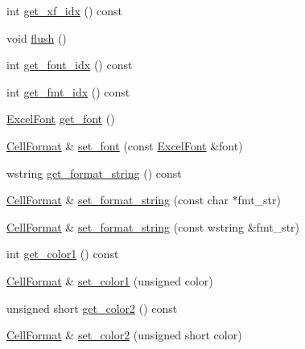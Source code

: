 \begin{DoxyCompactItemize}
\item 
int \hyperlink{struct_excel_format_1_1_cell_format_af678b79b8c8dbbb6a521c01cadd4ae5d}{get\+\_\+xf\+\_\+idx} () const 
\item 
void \hyperlink{struct_excel_format_1_1_cell_format_aeb3ceb42c80ec9f02a329f9bfa3aafdf}{flush} ()
\item 
int \hyperlink{struct_excel_format_1_1_cell_format_a5a50b4ec7c14f7144ff099a9b52301c9}{get\+\_\+font\+\_\+idx} () const 
\item 
int \hyperlink{struct_excel_format_1_1_cell_format_a1b557944889ef7cd493e6f6fee96a0b8}{get\+\_\+fmt\+\_\+idx} () const 
\item 
\hyperlink{struct_excel_format_1_1_excel_font}{Excel\+Font} \hyperlink{struct_excel_format_1_1_cell_format_a67fe7e97df32e192ab8e32a517f880a0}{get\+\_\+font} ()
\item 
\hyperlink{struct_excel_format_1_1_cell_format}{Cell\+Format} \& \hyperlink{struct_excel_format_1_1_cell_format_a584bde53b0699e233b3ca4e742a1fb5f}{set\+\_\+font} (const \hyperlink{struct_excel_format_1_1_excel_font}{Excel\+Font} \&font)
\item 
wstring \hyperlink{struct_excel_format_1_1_cell_format_a44e908835e6aae1c5bfda4e3adffecc7}{get\+\_\+format\+\_\+string} () const 
\item 
\hyperlink{struct_excel_format_1_1_cell_format}{Cell\+Format} \& \hyperlink{struct_excel_format_1_1_cell_format_aa4982e072d7292699e8302be63b966ba}{set\+\_\+format\+\_\+string} (const char $\ast$fmt\+\_\+str)
\item 
\hyperlink{struct_excel_format_1_1_cell_format}{Cell\+Format} \& \hyperlink{struct_excel_format_1_1_cell_format_afa1e52f7215fda94ecbf92029401fef3}{set\+\_\+format\+\_\+string} (const wstring \&fmt\+\_\+str)
\item 
int \hyperlink{struct_excel_format_1_1_cell_format_aef38f45721098661616821b754098e3b}{get\+\_\+color1} () const 
\item 
\hyperlink{struct_excel_format_1_1_cell_format}{Cell\+Format} \& \hyperlink{struct_excel_format_1_1_cell_format_a13809377fd6a57b49581dbe812e2d260}{set\+\_\+color1} (unsigned color)
\item 
unsigned short \hyperlink{struct_excel_format_1_1_cell_format_a753169625565b7f102e87e8435e29b0b}{get\+\_\+color2} () const 
\item 
\hyperlink{struct_excel_format_1_1_cell_format}{Cell\+Format} \& \hyperlink{struct_excel_format_1_1_cell_format_a072d07c3d52c584176f17a4d13a0d873}{set\+\_\+color2} (unsigned short color)

\end{DoxyCompactItemize}

